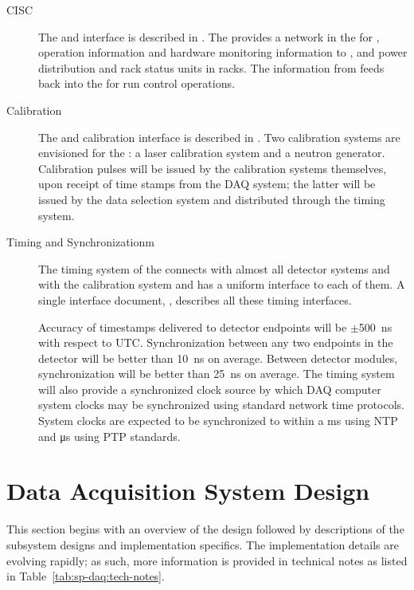 \begin{description}
\item[CISC] The  and  interface is described in
. The  provides a network in the  for ,  operation information and hardware
monitoring information to , and power distribution and
rack status units in  racks. The information from 
feeds back into the  for run control operations.

\item[Calibration] The  and calibration interface is described in
. Two calibration systems are envisioned for the
: a laser calibration system and a neutron
generator. Calibration pulses will be issued by the calibration
systems themselves, upon receipt of time stamps from the DAQ system;  %
the latter will be issued by the data selection system and distributed through the
 timing system.


\item[Timing and Synchronizationm] The timing system of the
    connects with 
almost all detector systems and with the calibration system and has a uniform interface to each of
them. 
A single interface document,
, describes all these timing interfaces. 

Accuracy of timestamps delivered to  detector endpoints will be $\pm$\SI{500}{\nano\second} with respect to UTC.  Synchronization between any two endpoints in the detector will be better than \SI{10}{\nano\second} on average.   Between detector modules, synchronization will be better than \SI{25}{\nano\second} on average.  The timing system will also provide a synchronized clock source by which DAQ computer system clocks may be synchronized using standard network time protocols.  System clocks are expected to be synchronized to within a ms using NTP and \si{\micro\second} using PTP standards. 
\end{description}

\section{Data Acquisition System Design}
\label{sec:fd-daq:design}

This section begins with an overview of the 
design followed by %
descriptions of the subsystem designs and implementation specifics. The
implementation details are evolving rapidly; as such, more information
is provided in technical notes as listed in Table~\ref{tab:sp-daq:tech-notes}. 

